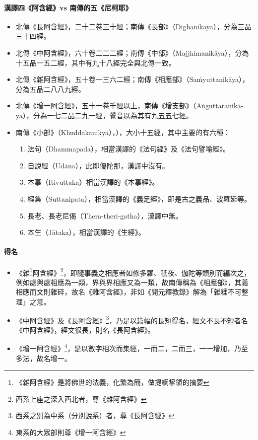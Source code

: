 \paragraph{漢譯四《阿含經》vs 南傳的五《尼柯耶》}
\begin{itemize}
  \item 北傳《長阿含經》，二十二卷三十經；南傳《長部》（Dīghanikāya），分為三品三十四經。
  \item 北傳《中阿含經》，六十卷二二二經；南傳《中部》（Majjhimanikāya），分為十五品一五二經，其中有九十八經完全與北傳一致。
  \item 北傳《雜阿含經》，五十卷一三六二經；南傳《相應部》（Saṁyuttanikāya），分為五品二八八九經。
  \item 北傳《增一阿含經》，五十一卷千經以上，南傳《增支部》（Aṅguttaranikā-ya），分為一七二品二九一經，覺音以為其有九五五七經。
  \item 南傳《小部》（Khuddakanikya），），大小十五經，其中主要的有六種：
    \begin{enumerate}
      \item 法句（Dhammapada），相當漢譯的《法句經》及《法句譬喻經》。
      \item 自說經（Udāna），此即優陀那，漢譯中沒有。
      \item 本事（Itivuttaka）相當漢譯的《本事經》。
      \item 經集（Suttanipata），相當漢譯的《義足經》，即是古之義品、波羅延等。
      \item 長老、長老尼偈（Thera-theri-gatha），漢譯中無。
      \item 本生（Jātaka），相當漢譯的《生經》。
    \end{enumerate}
\end{itemize}
\paragraph{得名}
\begin{itemize}
  \item 《雜\footnote{《雜阿含經》是將佛世的法義，化繁為簡，做提綱挈領的摘要}阿含經》\footnote{西系上座之深入西北者，尊《雜阿含經》}，即隨事義之相應者如修多羅、祇夜、伽陀等類別而編次之，例如處與處相應為一類，界與界相應又為一類，故南傳稱為《相應部》，其義相應而文則雜碎，故名《雜阿含經》，非如《開元釋教錄》解為「雜糅不可整理」之意。
  \item 《中阿含經》及《長阿含經》\footnote{西系之別為中系（分別說系）者，尊《長阿含經》}，乃是以篇幅的長短得名，經文不長不短者名《中阿含經》，經文很長，則名《長阿含經》。
  \item 《增一阿含經》\footnote{東系的大眾部則尊《增一阿含經》}，是以數字相次而集經，一而二，二而三，一一增加，乃至多法，故名增一。
\end{itemize}

